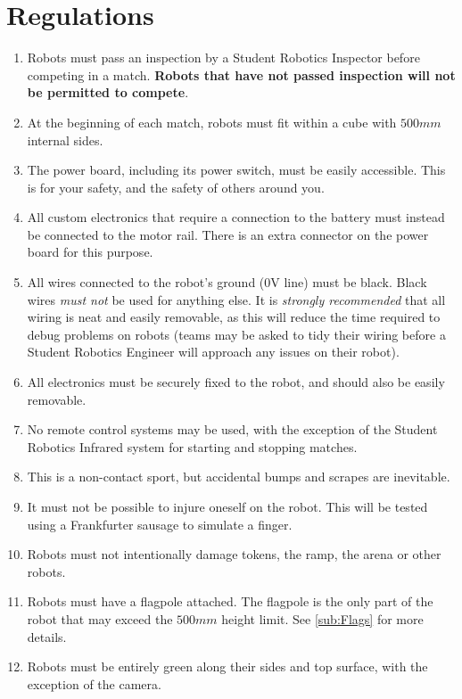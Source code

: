 \section {Regulations}
\label{sec:Regulations}

\begin{enumerate}
\item Robots must pass an inspection by a Student Robotics Inspector before competing in a match.
 \textbf{Robots that have not passed inspection will not be permitted to compete}.
\item At the beginning of each match, robots must fit within a cube with $500mm$ internal sides.
\item The power board, including its power switch, must be easily accessible.
 This is for your safety, and the safety of others around you.
\item All custom electronics that require a connection to the battery must instead be connected to the motor rail.
 There is an extra connector on the power board for this purpose.
\item All wires connected to the robot's ground (0V line) must be black.
 Black wires \emph{must not} be used for anything else.
 It is \emph{strongly recommended} that all wiring is neat and easily removable, as this will reduce the time required to debug problems on robots
  (teams may be asked to tidy their wiring before a Student Robotics Engineer will approach any issues on their robot).
\item All electronics must be securely fixed to the robot, and should also be easily removable.
\item No remote control systems may be used, with the exception of the Student Robotics Infrared system for starting and stopping matches.
\item This is a non-contact sport, but accidental bumps and scrapes are inevitable.
\item It must not be possible to injure oneself on the robot.
 This will be tested using a Frankfurter sausage to simulate a finger.
\item Robots must not intentionally damage tokens, the ramp, the arena or other robots.
\item Robots must have a flagpole attached.  The flagpole is the only part of the robot that may exceed the $500mm$ height limit.  See \autoref{sub:Flags} for more details.
\item Robots must be entirely green along their sides and top surface, with the exception of the camera.

\end{enumerate}
